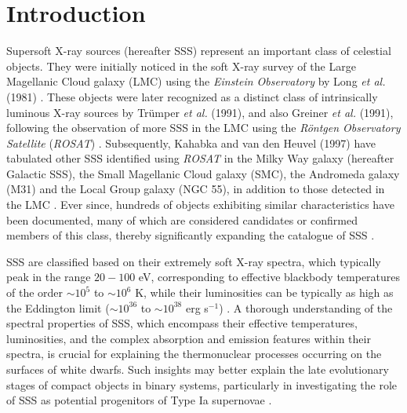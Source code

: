 \section{Introduction}
    
    Supersoft X-ray sources (hereafter SSS) represent an important class of celestial objects. They were initially noticed in the soft X-ray survey  of the Large Magellanic Cloud galaxy (LMC) using the \textit{Einstein Observatory} by Long \textit{et al.} (1981) \cite{long81}. These objects were later recognized as a distinct class of intrinsically luminous X-ray sources by Trümper \textit{et al.} (1991), and also Greiner \textit{et al.} (1991), following the observation of more SSS in the LMC using the \textit{R\"{o}ntgen Observatory Satellite} (\textit{ROSAT}) \cite{trumper1991x, greiner1991rosat}. Subsequently, Kahabka and van den Heuvel (1997) have tabulated other SSS identified using \textit{ROSAT} in the Milky Way galaxy (hereafter Galactic SSS), the Small Magellanic Cloud galaxy (SMC), the Andromeda galaxy (M31) and the Local Group galaxy (NGC 55), in addition to those detected in the LMC \cite{kahabka97}. Ever since, hundreds of objects exhibiting similar characteristics have been documented, many of which are considered candidates or confirmed members of this class, thereby significantly expanding the catalogue of SSS \cite{kahabkatrumper1996, steinerdiaz1998, greiner2000, pietsch2003deep, di2003luminous, orio2010census, henze2010recent, sturm2012new, galiullin2021populations}.
    
    SSS are classified based on their extremely soft X-ray spectra, which typically peak in the range $20-100$ eV, corresponding to effective blackbody temperatures of the order $\sim 10^5$ to $\sim 10^6$ K, while their luminosities can be typically as high as the Eddington limit ($\sim 10^{36}$ to $\sim 10^{38}$ erg s$^{-1}$) \cite{kahabka06}. A thorough understanding of the spectral properties of SSS, which encompass their effective temperatures, luminosities, and the complex absorption and emission features within their spectra, is crucial for explaining the thermonuclear processes occurring on the surfaces of white dwarfs. Such insights may better explain the late evolutionary stages of compact objects in binary systems, particularly in investigating the role of SSS as potential progenitors of Type Ia supernovae \cite{di2006luminous}.
    
